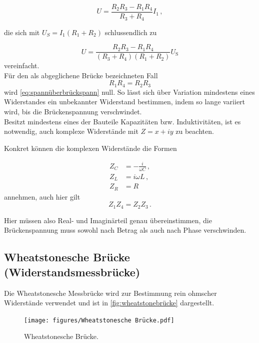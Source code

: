 \begin{equation}
    U = \frac{R_2 R_3 - R_1 R_4}{R_3 + R_4} I_1 \,,
    \label{eq:spannungglei4}
\end{equation}

die sich mit $U_S = I_1 (R_1 + R_2)$ schlussendlich zu 

\begin{equation}
    U = \frac{R_2 R_3 - R_1 R_4}{(R_3 + R_4)(R_1 + R_2)} U_{\text{S}}
    \label{eq:spannüberbrückspann}
\end{equation} vereinfacht. \\

Für den als abgeglichene Brücke bezeichneten Fall 
\begin{equation}
    R_1 R_4 = R_2 R_3
    \label{eq:abgleichbed}
\end{equation} wird \eqref{eq:spannüberbrückspann} null. 
So lässt sich über Variation mindestens eines Widerstandes ein unbekannter Widerstand bestimmen, indem so lange variiert wird, bis die Brückenspannung verschwindet.\\

Besitzt mindestens eines der Bauteile Kapazitäten bzw. Induktivitäten, ist es notwendig, auch komplexe Widerstände mit $Z = x + iy$ zu beachten.

Konkret können die komplexen Widerstände die Formen

\begin{align}
    \nonumber
    Z_C & = -\frac{i}{ω C} \,, \\
    \nonumber
    Z_L & = i ω L  \,, \\
    \nonumber
    Z_R & = R  
\end{align} 
annehmen, auch hier gilt
\begin{equation*}
    Z_1 Z_4 = Z_2 Z_3 \,.
\end{equation*} 

Hier müssen also Real- und Imaginärteil genau übereinstimmen, die Brückenspannung muss sowohl nach Betrag als auch nach Phase verschwinden.


\subsection{Wheatstonesche Brücke (Widerstandsmessbrücke)}
\label{subsec:wheatstone}

Die Wheatstonesche Messbrücke wird zur Bestimmung rein ohmscher Widerstände verwendet und ist in \autoref{fig:wheatstonebrücke} dargestellt.

\begin{figure}[H]
    \centering
    \texttt{[image: figures/Wheatstonesche Brücke.pdf]}
    \caption{Wheatstonesche Brücke\cite{ap07}.}
    \label{fig:wheatstonebrücke}
\end{figure}

